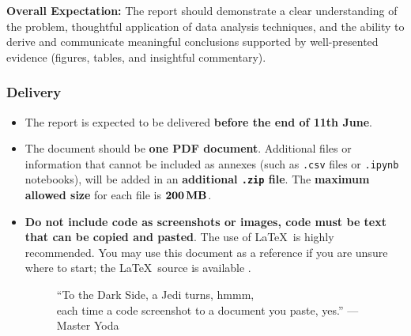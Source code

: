 \documentclass[11pt]{exam}
\begin{document}
    \textbf{Overall Expectation:} The report should demonstrate a clear understanding of the problem, thoughtful application of data analysis techniques, and the ability to derive and communicate meaningful conclusions supported by well-presented evidence (figures, tables, and insightful commentary).

    \subsubsection{Delivery}
    \begin{itemize}
        \item The report is expected to be delivered \href{https://atenea.upc.edu/mod/assign/view.php?id=4865448}{} \textbf{before the end of 11th June}.
        \item The document should be \textbf{one PDF document}. Additional files or information that cannot be included as annexes (such as \texttt{.csv} files or \texttt{.ipynb} notebooks), will be added in an \textbf{additional \texttt{.zip} file}. The \textbf{maximum allowed size} for each file is $\SI{\mathbf{200}}{\mathbf{\mega\byte}}$. %
        \item \textbf{Do not include code as screenshots or images, code must be text that can be copied and pasted}. The use of \LaTeX\ is highly recommended. You may use this document as a reference if you are unsure where to start; the \LaTeX~source is available \href{https://github.com/joanfrancesc/Data-Analysis-Project}{}.

        \begin{figure}[H] %
            \centering
            \caption{``To the Dark Side, a Jedi turns, hmmm, \\each time a code screenshot to a document you paste, yes.'' --- Master Yoda}
            \label{fig:NoScreenshots}
        \end{figure}
    \end{itemize}
\end{document}
